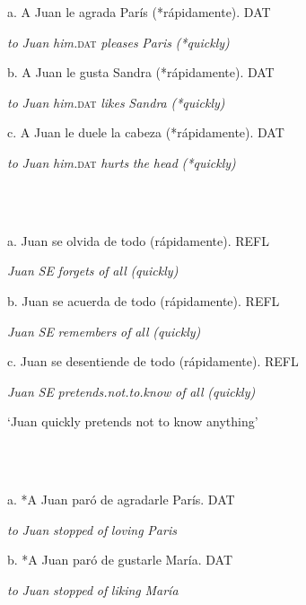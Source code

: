 \documentclass[output=paper,modfonts,nonflat]{langsci/langscibook}
\begin{document}
            

a. A Juan   le       agrada   París (*rápidamente).          DAT

  \textit{to} \textit{Juan}   \textit{him.}\textsc{dat}   \textit{pleases}   \textit{Paris} \textit{(*quickly)} 

b. A Juan   le       gusta Sandra (*rápidamente).          DAT

      \textit{to} \textit{Juan}   \textit{him.}\textsc{dat}   \textit{likes}   \textit{Sandra} \textit{(*quickly)}  

c. A Juan   le       duele la cabeza (*rápidamente).          DAT

   \textit{to} \textit{Juan}   \textit{him.}\textsc{dat}   \textit{hurts} \textit{the} \textit{head} \textit{(*quickly)}

\ea%
    \label{ex:key:2}
    \gll\\
        \\
    \glt
    \z

            

a.   Juan  se  olvida   de todo   (rápidamente).                REFL

      \textit{Juan} \textit{SE} \textit{forgets}   \textit{of}   \textit{all}   \textit{(quickly)} 

b.   Juan  se  acuerda     de todo   (rápidamente).              REFL

      \textit{Juan} \textit{SE} \textit{remembers}   \textit{of}   \textit{all}   \textit{(quickly)}

c.   Juan  se desentiende        de todo   (rápidamente).        REFL

    \textit{Juan} \textit{SE} \textit{pretends.not.to.know} \textit{of} \textit{all}   \textit{(quickly)}  

‘Juan quickly pretends not to know anything’ 

\ea%
    \label{ex:key:3}
    \gll\\
        \\
    \glt
    \z

            

a. *A Juan paró     de agradarle   París.                  DAT

     \textit{to} \textit{Juan} \textit{stopped}   \textit{of}   \textit{loving}     \textit{Paris} 

b. *A Juan paró     de gustarle     María.                DAT

      \textit{to} \textit{Juan}  \textit{stopped}  \textit{of} \textit{liking}      \textit{María}
\end{document}

